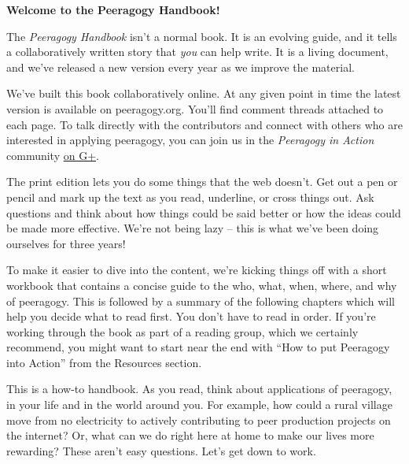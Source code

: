 \textbf{Welcome to the Peeragogy Handbook!}

The \emph{Peeragogy Handbook} isn't a normal book.  It is an evolving
guide, and it tells a collaboratively written story that \emph{you}
can help write.  It is a living document, and we've released a new
version every year as we improve the material.   

We've built this book collaboratively online.  At any given point in
time the latest version is available on peeragogy.org.  You'll find
comment threads attached to each page.  To talk directly with the
contributors and connect with others who are interested in applying
peeragogy, you can join us in the \emph{Peeragogy in Action}
community \href{https://plus.google.com/communities/107386162349686249470}{on
G+}.

The print edition lets you do some things that the web doesn't.  Get
out a pen or pencil and mark up the text as you read, underline, or
cross things out.  Ask questions and think about how things could be
said better or how the ideas could be made more effective.  We're not
being lazy -- this is what we've been doing ourselves for three years!

To make it easier to dive into the content, we're kicking things off
with a short workbook that contains a concise guide to the who, what,
when, where, and why of peeragogy.  This is followed by a summary of
the following chapters which will help you decide what to read first.
You don't have to read in order.  If you're working through the book
as part of a reading group, which we certainly recommend, you might
want to start near the end with ``How to put Peeragogy into Action''
from the Resources section.

This is a how-to handbook.  As you read, think about applications of
peeragogy, in your life and in the world around you.  For example, how
could a rural village move from no electricity to actively
contributing to peer production projects on the internet?  Or, what
can we do right here at home to make our lives more rewarding?  These
aren't easy questions.  Let's get down to work.

